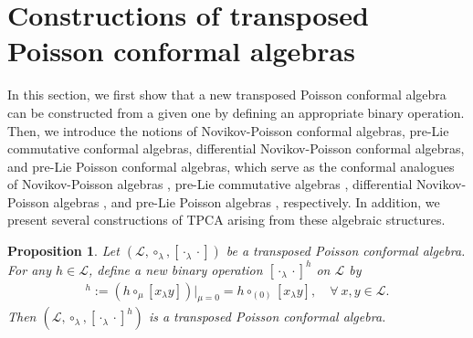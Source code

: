 \documentclass[11pt,letterpaper,reqno]{amsart}
\newtheorem{proposition}[theorem]{Proposition}
\theoremstyle{definition}
\numberwithin{equation}{section}
\begin{document}
\section{Constructions of transposed Poisson conformal algebras}\label{sec4}
In this section, we first show that a new transposed Poisson conformal algebra can be constructed from a given one by defining an appropriate binary operation.
Then, we introduce the notions of Novikov-Poisson conformal algebras, pre-Lie commutative conformal algebras, differential Novikov-Poisson conformal algebras, and pre-Lie Poisson conformal algebras,
which serve as the conformal analogues of Novikov-Poisson algebras \cite{Xu97}, pre-Lie commutative algebras \cite{MA14}, differential Novikov-Poisson algebras \cite{BCZ18}, and pre-Lie Poisson algebras \cite{Bai23}, respectively.
In addition, we present several constructions of TPCA arising from these algebraic structures.

\begin{proposition}
   Let $(\mathcal{L} ,\circ_\lambda,[\cdot_{\lambda}\cdot])$ be a transposed Poisson conformal algebra. For any $h\in \mathcal{L}$, define a new binary operation $[\cdot_{\lambda}\cdot]^h$ on $\mathcal{L}$ by
   \begin{align*}
      [x_{\lambda}y]^h:=(h\circ_{\mu}[x_{\lambda}y])|_{\mu=0}=h\circ_{(0)}[x_{\lambda}y], \quad \forall ~x,y\in \mathcal{L}.
   \end{align*}
   Then $(\mathcal{L} ,\circ_\lambda, [\cdot_{\lambda}\cdot]^h)$ is a transposed Poisson conformal algebra.
\end{proposition}
\end{document}
